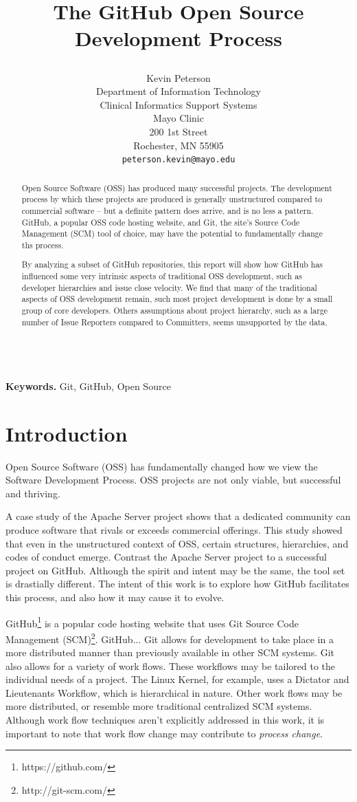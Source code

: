 \documentclass{proc}
\title{
The GitHub Open Source Development Process
\author{Kevin Peterson\\
Department of Information Technology\\
Clinical Informatics Support Systems\\
Mayo Clinic\\
200 1st Street\\
Rochester, MN  55905\\
\small \texttt{peterson.kevin@mayo.edu}
}
}
\begin{document}
\maketitle

\begin{abstract}
Open Source Software (OSS) has produced many successful projects. The development process by which these projects are produced is generally unstructured compared to commercial software -- but a definite pattern does arrive, and is no less a pattern. GitHub, a popular OSS code hosting website, and Git, the site's Source Code Management (SCM) tool of choice, may have the potential to fundamentally change ths process.

By analyzing a subset of GitHub repositories, this report will show how GitHub has influenced some very intrinsic aspects of traditional OSS development, such as developer hierarchies and issue close velocity. We find that many of the traditional aspects of OSS development remain, such most project development is done by a small group of core developers. Others assumptions about project hierarchy, such as a large number of Issue Reporters compared to Committers, seems unsupported by the data.
\end{abstract}

\noindent \\\textbf{Keywords.} Git, GitHub, Open Source

\section{Introduction}
Open Source Software (OSS) has fundamentally changed how we view the Software Development Process\cite{raymond1999cathedral}. OSS projects are not only viable, but successful and thriving. 

A case study of the Apache Server project\cite{mockus2000case} shows that a dedicated community can produce software that rivals or exceeds commercial offerings. This study showed that even in the unstructured context of OSS, certain structures, hierarchies, and codes of conduct emerge. Contrast the Apache Server project to a successful project on GitHub. Although the spirit and intent may be the same, the tool set is drastially different. The intent of this work is to explore how GitHub facilitates this process, and also how it may cause it to evolve.

GitHub\footnote{https://github.com/} is a popular code hosting website that uses Git Source Code Management (SCM)\footnote{http://git-scm.com/}. GitHub... Git allows for development to take place in a more distributed manner than previously available in other SCM systems\cite{spinellis2012git}. Git also allows for a variety of work flows\cite{chacon2009pro}. These workflows may be tailored to the individual needs of a project. The Linux Kernel, for example, uses a Dictator and
Lieutenants Workflow\cite{platschekfloss}, which is hierarchical in nature. Other work flows may be more distributed, or resemble more traditional centralized SCM systems. Although work flow techniques aren't explicitly addressed in this work, it is important to note that work flow change may contribute to \textit{process change}.
\end{document}
